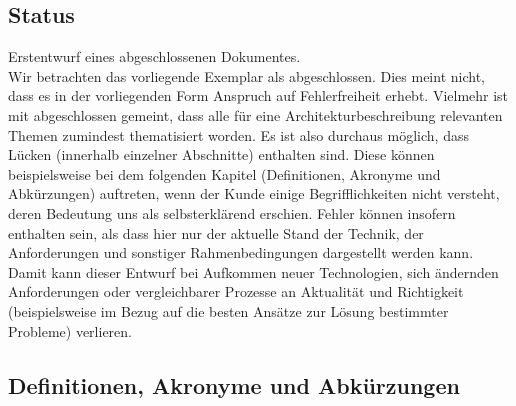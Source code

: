 \documentclass[enabledeprecatedfontcommands,fontsize=11pt,paper=a4,twoside]{scrartcl}
\newcounter{one}
\begin{document}
\subsection{Status}
Erstentwurf eines abgeschlossenen Dokumentes. \\
Wir betrachten das vorliegende Exemplar als abgeschlossen. Dies meint nicht, dass es in der vorliegenden Form Anspruch auf Fehlerfreiheit erhebt. Vielmehr ist mit abgeschlossen gemeint, dass alle für eine Architekturbeschreibung relevanten Themen zumindest thematisiert worden. Es ist also durchaus möglich, dass Lücken (innerhalb einzelner Abschnitte) enthalten sind. Diese können beispielsweise bei dem folgenden Kapitel (Definitionen, Akronyme und Abkürzungen) auftreten, wenn der Kunde einige Begrifflichkeiten nicht versteht, deren Bedeutung uns als selbsterklärend erschien. Fehler können insofern enthalten sein, als dass hier nur der aktuelle Stand der Technik, der Anforderungen und sonstiger Rahmenbedingungen dargestellt werden kann. Damit kann dieser Entwurf bei Aufkommen neuer Technologien, sich ändernden Anforderungen oder vergleichbarer Prozesse an Aktualität und Richtigkeit (beispielsweise im Bezug auf die besten Ansätze zur Lösung bestimmter Probleme) verlieren.

\newpage
\subsection{Definitionen, Akronyme und Abkürzungen}
\end{document}
